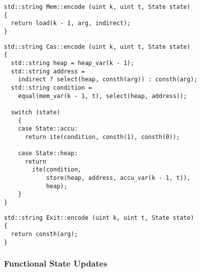 
\begin{lstlisting}[style=c++]
std::string Mem::encode (uint k, uint t, State state)
{
  return load(k - 1, arg, indirect);
}
\end{lstlisting}


\begin{lstlisting}[style=c++]
std::string Cas::encode (uint k, uint t, State state)
{
  std::string heap = heap_var(k - 1);
  std::string address =
    indirect ? select(heap, consth(arg)) : consth(arg);
  std::string condition =
    equal(mem_var(k - 1, t), select(heap, address));

  switch (state)
    {
    case State::accu:
      return ite(condition, consth(1), consth(0));

    case State::heap:
      return
        ite(condition,
            store(heap, address, accu_var(k - 1, t)),
            heap);
    }
}
\end{lstlisting}


\begin{lstlisting}[style=c++]
std::string Exit::encode (uint k, uint t, State state)
{
  return consth(arg);
}
\end{lstlisting}

\subsubsection{Functional State Updates}


